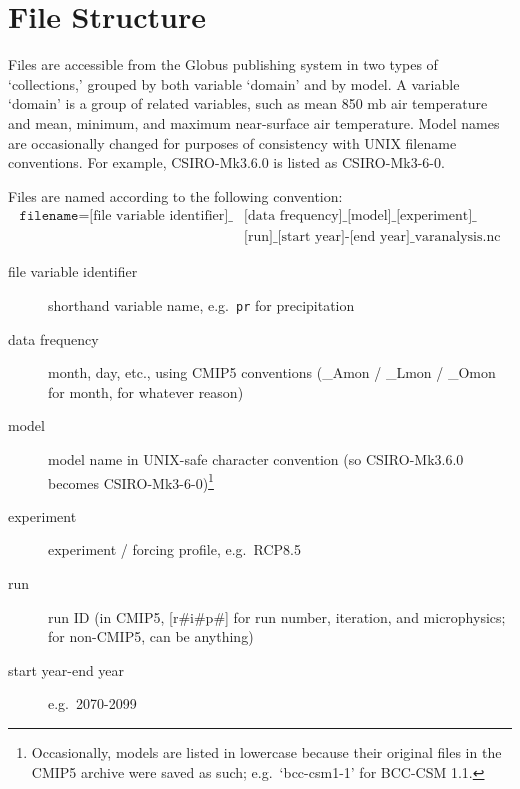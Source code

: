 \documentclass[11pt]{amsart}
\begin{document}
\section{File Structure}
Files are accessible from the Globus publishing system in two types of `collections,' grouped by both variable `domain' and by model. A variable `domain' is a group of related variables, such as mean 850 mb air temperature and mean, minimum, and maximum near-surface air temperature. Model names are occasionally changed for purposes of consistency with UNIX filename conventions. For example, CSIRO-Mk3.6.0 is listed as CSIRO-Mk3-6-0. 

Files are named according to the following convention: 
\begin{equation}
\begin{split}
\texttt{filename} = \text{[file variable identifier]\_}&\text{[data frequency]\_[model]\_[experiment]\_}\\
&\text{[run]\_[start year]-[end year]\_varanalysis.nc}
\end{split}
\end{equation}
\begin{description}
\item [file variable identifier] shorthand variable name, e.g.\ \texttt{pr} for precipitation
\item [data frequency] month, day, etc., using CMIP5 conventions (\_Amon / \_Lmon / \_Omon for month, for whatever reason)
\item [model] model name in UNIX-safe character convention (so CSIRO-Mk3.6.0 becomes CSIRO-Mk3-6-0)\footnote{Occasionally, models are listed in lowercase because their original files in the CMIP5 archive were saved as such; e.g.\ `bcc-csm1-1' for BCC-CSM 1.1.} 
\item [experiment] experiment / forcing profile, e.g.\ RCP8.5
\item [run] run ID (in CMIP5, [r\#i\#p\#] for run number, iteration, and microphysics; for non-CMIP5, can be anything)
\item [start year-end year] e.g.\ 2070-2099
\end{description}
\end{document}
